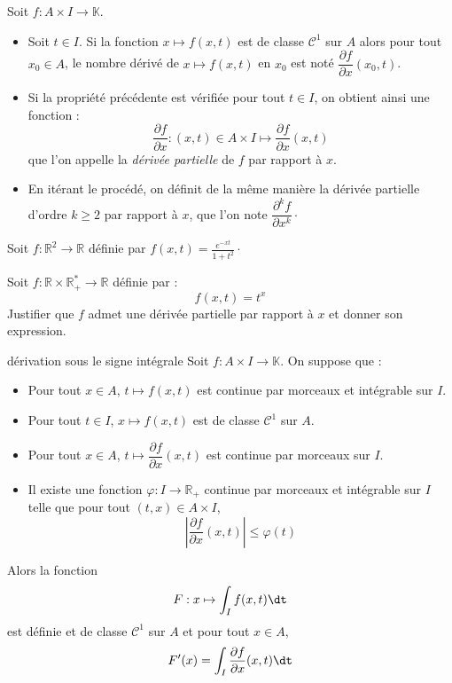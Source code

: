 \documentclass[a4paper,10pt]{report}
\begin{document}
\begin{Definition}{} Soit $f : A \times I \rightarrow \mathbb{K}$.

\begin{itemize}
\item Soit $t \in I$. Si la fonction $x \mapsto f(x,t)$ est de classe $\mathcal{C}^1$ sur $A$ alors pour tout $x_0 \in A$, le nombre dérivé de $x \mapsto f(x,t)$ en $x_0$ est noté $\dfrac{\partial f}{\partial x} (x_0,t)$.
\item Si la propriété précédente est vérifiée pour tout $t \in I$, on obtient ainsi une fonction :
$$ \dfrac{\partial f}{\partial x} : (x,t) \in A \times I \mapsto \dfrac{\partial f}{\partial x}(x,t)$$
que l'on appelle la \emph{dérivée partielle} de $f$ par rapport à $x$.
\item En itérant le procédé, on définit de la même manière la dérivée partielle d'ordre $k \geq 2$ par rapport à $x$, que l'on note $\dfrac{\partial^k f}{\partial x^k} \cdot$
\end{itemize}
\end{Definition}

\medskip

\begin{Exemple} Soit $f : \mathbb{R}^2 \rightarrow \mathbb{R}$ définie par $f(x,t) = \frac{e^{-xt}}{1+t^2}\cdot$

\vspace{4cm}
\end{Exemple}

\begin{ApplicationDirecte} Soit $f : \mathbb{R} \times \mathbb{R}_+^{*} \rightarrow \mathbb{R}$ définie par :
$$ f(x,t) = t^x$$
Justifier que $f$ admet une dérivée partielle par rapport à $x$ et donner son expression. 
\end{ApplicationDirecte}

\begin{Theoreme}{dérivation sous le signe intégrale}
Soit $f : A \times I \rightarrow \mathbb{K}$. On suppose que :
\begin{itemize}
\item Pour tout $x \in A$, $t \mapsto f(x,t)$ est continue par morceaux et intégrable sur $I$.
\item Pour tout $t \in I$, $x \mapsto f(x,t)$ est de classe $\mathcal{C}^1$ sur $A$.
\item Pour tout $x \in A$, $t \mapsto \dfrac{\partial f}{\partial x}(x,t)$ est continue par morceaux sur $I$.
\item Il existe une fonction $\varphi : I \rightarrow \mathbb{R}_+$ continue par morceaux et intégrable sur $I$ telle que pour tout $(t,x) \in A \times I$,
$$ \left\vert \dfrac{\partial f}{\partial x}(x,t) \right\vert \leq \varphi(t)$$
\end{itemize}
Alors la fonction 
$$ F : x \mapsto \int_{I} f(x,t) \dt$$
est définie et de classe $\mathcal{C}^1$ sur $A$ et pour tout $x \in A$,
$$ F'(x) = \int_{I}  \dfrac{\partial f}{\partial x}(x,t) \dt$$
\end{Theoreme}
\end{document}
